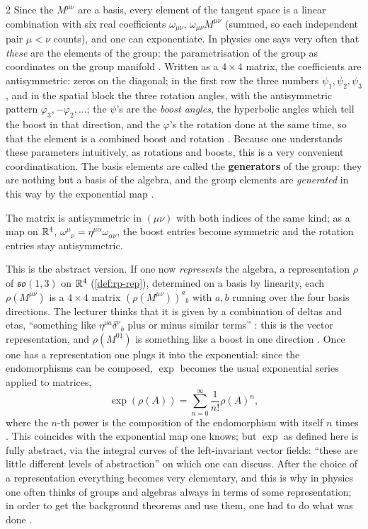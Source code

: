 \begin{paracol}{2}
Since the $M^{\mu\nu}$ are a basis, every element of the tangent space is a linear combination with six real coefficients $\omega_{\mu\nu}$, $\omega_{\mu\nu}M^{\mu\nu}$ (summed, so each independent pair $\mu<\nu$ counts), and one can exponentiate. In physics one says very often that \emph{these} are the elements of the group: the parametrisation of the group as coordinates on the group manifold . Written as a $4\times4$ matrix, the coefficients are antisymmetric: zeros on the diagonal; in the first row the three numbers $\psi_1,\psi_2,\psi_3$, and in the spatial block the three rotation angles, with the antisymmetric pattern $\varphi_3,-\varphi_2,\dots$; the $\psi$'s are the \emph{boost angles}, the hyperbolic angles which tell the boost in that direction, and the $\varphi$'s the rotation done at the same time, so that the element is a combined boost and rotation   . Because one understands these parameters intuitively, as rotations and boosts, this is a very convenient coordinatisation. The basis elements are called the \textbf{generators} of the group: they are nothing but a basis of the algebra, and the group elements are \emph{generated} in this way by the exponential map .
\begin{coursenote}
The matrix is antisymmetric in $(\mu\nu)$ with both indices of the same kind; as a map on $\mathbb{R}^4$, $\omega^\mu{}_\nu=\eta^{\mu\alpha}\omega_{\alpha\nu}$, the boost entries become symmetric and the rotation entries stay antisymmetric. 
\end{coursenote}
This is the abstract version. If one now \emph{represents} the algebra, a representation $\rho$ of $\mathfrak{so}(1,3)$ on $\mathbb{R}^4$ (\cref{def:rp-rep}), determined on a basis by linearity, each $\rho(M^{\mu\nu})$ is a $4\times4$ matrix $(\rho(M^{\mu\nu}))^a{}_b$ with $a,b$ running over the four basis directions. The lecturer thinks that it is given by a combination of deltas and etas, ``something like $\eta^{\mu a}\delta^\nu{}_b$ plus or minus similar terms''    : this is the vector representation, and $\rho(M^{01})$ is something like a boost in one direction . Once one has a representation one plugs it into the exponential: since the endomorphisms can be composed, $\exp$ becomes the usual exponential series applied to matrices,
\[
  \exp(\rho(A))=\sum_{n=0}^\infty\frac{1}{n!}\rho(A)^n ,
\]
where the $n$-th power is the composition of the endomorphism with itself $n$ times  . This coincides with the exponential map one knows; but $\exp$ as defined here is fully abstract, via the integral curves of the left-invariant vector fields: ``these are little different levels of abstraction'' on which one can discuss. After the choice of a representation everything becomes very elementary, and this is why in physics one often thinks of groups and algebras always in terms of some representation; in order to get the background theorems and use them, one had to do what was done  .

\end{paracol}
